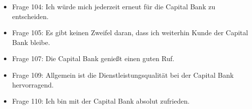 \documentclass{article}\usepackage[]{graphicx}\usepackage[]{color}
\begin{document}
\begin{enumerate}
\begin{itemize}
    \item Frage 104:
    Ich würde mich jederzeit erneut für die Capital Bank zu entscheiden.
    \item Frage 105:
    Es gibt keinen Zweifel daran, dass ich weiterhin Kunde der Capital Bank bleibe.
    \item Frage 107:
    Die Capital Bank genießt einen guten Ruf.
    \item Frage 109:
    Allgemein ist die Dienstleistungsqualität bei der Capital Bank hervorragend.
    \item Frage 110:
    Ich bin mit der Capital Bank absolut zufrieden.
    \end{itemize}


\end{enumerate}

\clearpage
\end{document}
